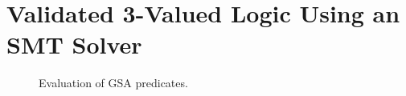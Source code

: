 {%

\section{Validated 3-Valued Logic Using an SMT Solver}%
\label{sec:hs:efficient-smt-solver-validation}

\begin{figure}
\caption{Evaluation of GSA predicates.}
\label{fig:evalpred}
\end{figure}


}

